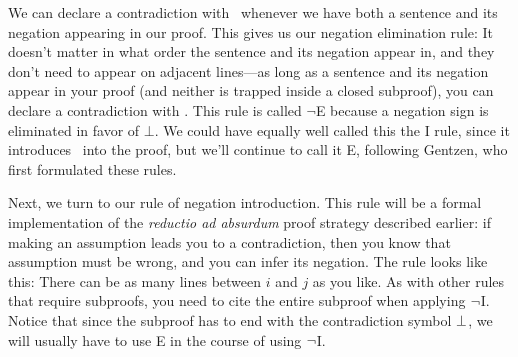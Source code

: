 We can declare a contradiction with \ered \ whenever we  have both a sentence and its negation appearing in our proof.  This gives us our negation elimination rule:
It doesn't matter in what order the sentence and its negation appear in, and they don't need to appear on adjacent lines---as long as a sentence and its negation appear in your proof (and neither is trapped inside a closed subproof), you can declare a contradiction with \ered.  This rule is called $\lnot$E because a negation sign is eliminated in favor of $\bot$.  We could have equally well called this the \ered I rule, since it introduces \ered \ into the proof, but we'll continue to call it \enot E, following Gentzen, who first formulated these rules.




Next, we turn to our rule of negation introduction. This rule will be a formal implementation of the \emph{reductio ad absurdum} proof strategy described earlier: if making an assumption leads you to a contradiction, then you know that assumption must be wrong, and you can infer its negation. The rule looks like this:
There can be as many lines between $i$ and $j$ as you like.  As with other rules that require subproofs, you need to cite the entire subproof when applying $\neg$I.  Notice that since the subproof has to end with the contradiction symbol $\bot$, we will usually have to use \enot E in the course of using $\neg$I.

